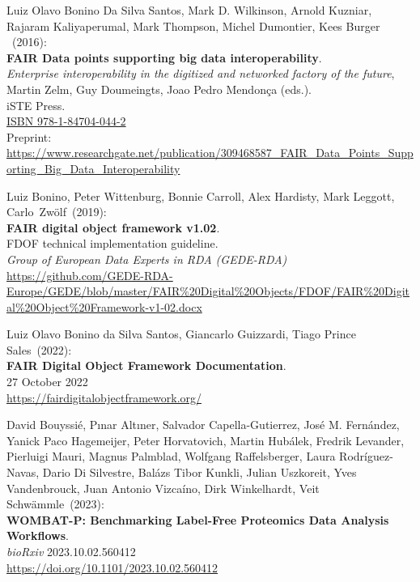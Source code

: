 \begin{thebibliography}{9}
Luiz Olavo Bonino Da Silva Santos, Mark D. Wilkinson, Arnold Kuzniar, Rajaram Kaliyaperumal, Mark Thompson, Michel Dumontier, Kees Burger ~(2016): \\
\textbf{FAIR Data points supporting big data interoperability}. \\
\emph{Enterprise interoperability in the digitized and networked factory of the future}, Martin Zelm, Guy Doumeingts, Joao Pedro Mendonça (eds.).\\
iSTE Press. \\
\href{http://www.iste.co.uk/book.php?id=1073}{ISBN 978-1-84704-044-2} \\
Preprint: \url{https://www.researchgate.net/publication/309468587_FAIR_Data_Points_Supporting_Big_Data_Interoperability}

Luiz Bonino, Peter Wittenburg, Bonnie Carroll, Alex Hardisty, Mark Leggott, Carlo~Zwölf~(2019): \\
\textbf{FAIR digital object framework v1.02}.\\
FDOF technical implementation guideline.\\
\emph{Group of European Data Experts in RDA (GEDE-RDA)}\\
\url{https://github.com/GEDE-RDA-Europe/GEDE/blob/master/FAIR\%20Digital\%20Objects/FDOF/FAIR\%20Digital\%20Object\%20Framework-v1-02.docx}

Luiz Olavo Bonino da Silva Santos, Giancarlo Guizzardi, Tiago Prince Sales~(2022): \\
\textbf{FAIR Digital Object Framework Documentation}. \\
27 October 2022\\
\url{https://fairdigitalobjectframework.org/}

David Bouyssié, Pınar Altıner, Salvador Capella-Gutierrez, José M. Fernández, Yanick Paco Hagemeijer, Peter Horvatovich, Martin Hubálek, Fredrik Levander, Pierluigi Mauri, Magnus Palmblad, Wolfgang Raffelsberger, Laura Rodríguez-Navas, Dario Di Silvestre, Balázs Tibor Kunkli, Julian Uszkoreit, Yves Vandenbrouck, Juan Antonio Vizcaíno, Dirk Winkelhardt, Veit Schwämmle~(2023): \\
\textbf{WOMBAT-P: Benchmarking Label-Free Proteomics Data Analysis Workflows}.\\
\emph{bioRxiv} 2023.10.02.560412 \\
\url{https://doi.org/10.1101/2023.10.02.560412}


\end{thebibliography}
